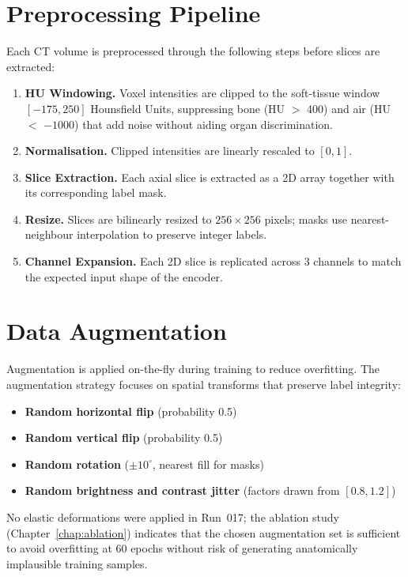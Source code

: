 \section{Preprocessing Pipeline}

Each CT volume is preprocessed through the following steps before slices are extracted:

\begin{enumerate}
    \item \textbf{HU Windowing.}  Voxel intensities are clipped to the soft-tissue window
          $[-175, 250]$ Hounsfield Units, suppressing bone (HU $>$ 400) and air (HU $<$ $-1000$)
          that add noise without aiding organ discrimination.
    \item \textbf{Normalisation.}  Clipped intensities are linearly rescaled to $[0, 1]$.
    \item \textbf{Slice Extraction.}  Each axial slice is extracted as a 2D array together
          with its corresponding label mask.
    \item \textbf{Resize.}  Slices are bilinearly resized to $256 \times 256$ pixels; masks use
          nearest-neighbour interpolation to preserve integer labels.
    \item \textbf{Channel Expansion.}  Each 2D slice is replicated across 3 channels to match
          the expected input shape of the encoder.
\end{enumerate}

\section{Data Augmentation}

Augmentation is applied on-the-fly during training to reduce overfitting. The augmentation
strategy focuses on spatial transforms that preserve label integrity:

\begin{itemize}
    \item \textbf{Random horizontal flip} (probability 0.5)
    \item \textbf{Random vertical flip} (probability 0.5)
    \item \textbf{Random rotation} ($\pm 10^\circ$, nearest fill for masks)
    \item \textbf{Random brightness and contrast jitter} (factors drawn from $[0.8, 1.2]$)
\end{itemize}

No elastic deformations were applied in Run~017; the ablation study (Chapter~\ref{chap:ablation})
indicates that the chosen augmentation set is sufficient to avoid overfitting at 60 epochs
without risk of generating anatomically implausible training samples.
